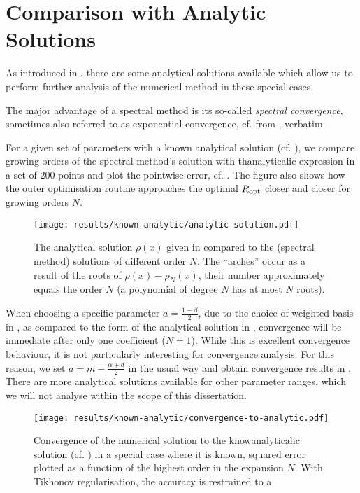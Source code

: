\section{Comparison with Analytic Solutions}
As introduced in , there are some analytical solutions available which allow us to perform further analysis of the numerical method in these special cases.

The major advantage of a spectral method is its so-called \textit{spectral convergence}, sometimes also referred to as exponential convergence, cf.  from \cite{2023-damtp-spectral-methods}, verbatim.


For a given set of parameters with a known analytical solution (cf. ), we compare growing orders of the spectral method's solution with thanalyticalic expression in a set of 200 points and plot the pointwise error, cf. .
The figure also shows how the outer optimisation routine approaches the optimal $R_{\rm opt}$ closer and closer for growing orders $N$.

\begin{figure}[H]
  \centering
  \texttt{[image: results/known-analytic/analytic-solution.pdf]}
  \caption[Comparison with analytical solutions and error]{
    The analytical solution $\rho(x)$ given in  compared to the (spectral method) solutions of different order $N$.
    The ``arches'' occur as a result of the roots of $\rho(x) - \rho_N(x)$, their number approximately equals the order $N$ (a polynomial of degree $N$ has at most $N$ roots).
  }
  \label{fig:analytic-solution}
\end{figure}

When choosing a specific parameter $a = \frac{1-\beta}{2}$, due to the choice of weighted basis in , as compared to the form of the analytical solution in , convergence will be immediate after only one coefficient ($N=1$).
While this is excellent convergence behaviour, it is not particularly interesting for convergence analysis.
For this reason, we set $a = m - \frac{\alpha+d}{2}$ in the usual way and obtain convergence results in .
There are more analytical solutions available for other parameter ranges, which we will not analyse within the scope of this dissertation.

\begin{figure}[H]
  \centering
  \texttt{[image: results/known-analytic/convergence-to-analytic.pdf]}
  \caption[Convergence to analytical solution]{Convergence of the numerical solution to the knowanalyticalic solution (cf. ) in a special case where it is known, squared error plotted as a function of the highest order in the expansion $N$. With Tikhonov regularisation, the accuracy is restrained to a }
  \label{fig:convergence-to-analytic}
\end{figure}
